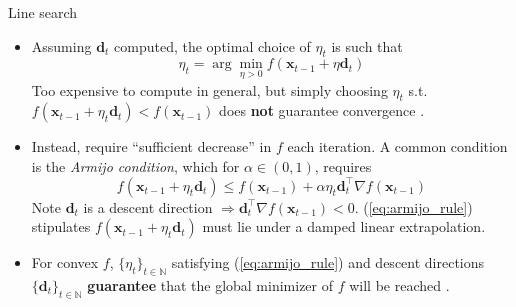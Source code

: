 \documentclass{beamer}
\numberwithin{equation}{section}
\newcommand{\aref}[1]{\alert{\ref{#1}}}
\begin{document}
\begin{frame}{Line search}
    \begin{itemize}
        \item
        Assuming $ \mathbf{d}_t $ computed, the optimal choice of $ \eta_t $
        is such that
        \begin{equation} \label{eq:exact_line_search}
            \eta_t = \arg\min_{\eta > 0}
            f(\mathbf{x}_{t - 1} + \eta\mathbf{d}_t)
        \end{equation}
        Too expensive to compute in general, but simply choosing $ \eta_t $
        s.t. $ f(\mathbf{x}_{t - 1} + \eta_t\mathbf{d}_t) <
        f(\mathbf{x}_{t - 1}) $ does \textbf{not} guarantee convergence
        \cite{nocedal_opt}.

        \item
        Instead, require ``sufficient decrease'' in $ f $ each iteration.
        A common condition is the \textit{Armijo condition}, which for
        $ \alpha \in (0, 1) $, requires
        \begin{equation} \label{eq:armijo_rule}
            f(\mathbf{x}_{t - 1} + \eta_t\mathbf{d}_t) \le
            f(\mathbf{x}_{t - 1}) + \alpha\eta_t\mathbf{d}_t^\top
            \nabla f(\mathbf{x}_{t - 1})
        \end{equation}
        Note $ \mathbf{d}_t $ is a descent direction $ \Rightarrow
        \mathbf{d}_t^\top\nabla f(\mathbf{x}_{t - 1}) < 0 $.
        (\aref{eq:armijo_rule}) stipulates $ f(\mathbf{x}_{t - 1} +
        \eta_t\mathbf{d}_t) $ must lie under a damped linear extrapolation.

        \item
        For convex $ f $, $ \{\eta_t\}_{t \in \mathbb{N}} $ satisfying
        (\aref{eq:armijo_rule}) and descent directions
        $ \{\mathbf{d}_t\}_{t \in \mathbb{N}} $ \textbf{guarantee} that the
        global minimizer of $ f $ will be reached \cite{stat_learn_sparsity}.
    \end{itemize}

    \medskip
\end{frame}
\end{document}

